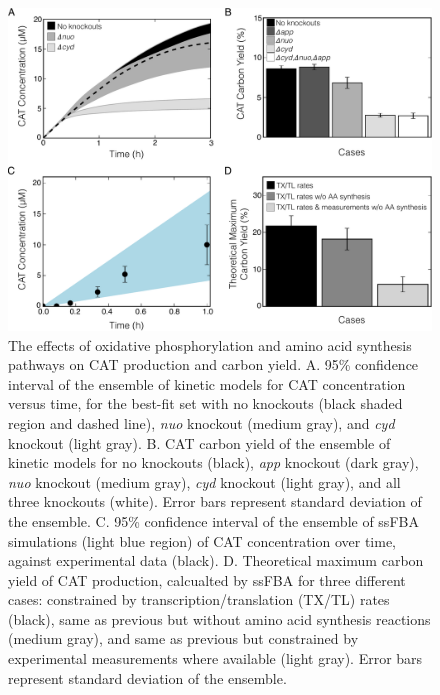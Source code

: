 \documentclass[12pt]{article}
\begin{document}
\begin{figure}[ht]
\centering
\includegraphics[width=1\textwidth]{./Figures/oxKO_ssFBA_yields.pdf}
\caption{The effects of oxidative phosphorylation and amino acid synthesis pathways on CAT production and carbon yield. A. 95\% confidence interval of the ensemble of kinetic models for CAT concentration versus time, for the best-fit set with no knockouts (black shaded region and dashed line), \textit{nuo} knockout (medium gray), and \textit{cyd} knockout (light gray). B. CAT carbon yield of the ensemble of kinetic models for no knockouts (black), \textit{app} knockout (dark gray), \textit{nuo} knockout (medium gray), \textit{cyd} knockout (light gray), and all three knockouts (white). Error bars represent standard deviation of the ensemble. C. 95\% confidence interval of the ensemble of ssFBA simulations (light blue region) of CAT concentration over time, against experimental data (black). D. Theoretical maximum carbon yield of CAT production, calcualted by ssFBA for three different cases: constrained by transcription/translation (TX/TL) rates (black), same as previous but without amino acid synthesis reactions (medium gray), and same as previous but constrained by experimental measurements where available (light gray). Error bars represent standard deviation of the ensemble.}
\label{fig:oxKO_ssFBA_yields}
\end{figure}
\clearpage
\end{document}
